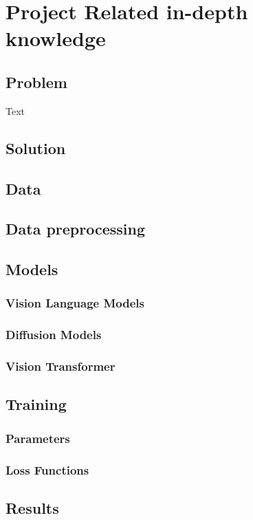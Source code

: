 \chapter{Project Related in-depth knowledge}

\section{Problem}
Text
\section{Solution}

\section{Data}

\section{Data preprocessing}

\section{Models}

\subsection{Vision Language Models}

\subsection{Diffusion Models}

\subsection{Vision Transformer}


\section{Training}
\subsection{Parameters}
\subsection{Loss Functions}


\section{Results}








